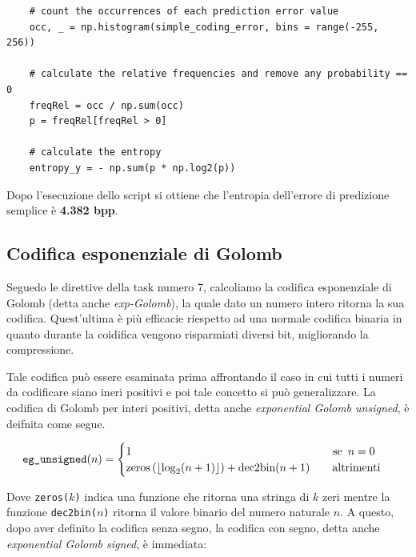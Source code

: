 \begin{lstlisting}
    # count the occurrences of each prediction error value
    occ, _ = np.histogram(simple_coding_error, bins = range(-255, 256))

    # calculate the relative frequencies and remove any probability == 0
    freqRel = occ / np.sum(occ)
    p = freqRel[freqRel > 0]

    # calculate the entropy
    entropy_y = - np.sum(p * np.log2(p))
\end{lstlisting}

\noindent Dopo l'esecuzione dello script si ottiene che l'entropia dell'errore di predizione semplice è \textbf{4.382 bpp}.



\subsection{Codifica esponenziale di Golomb}\label{exp-golomb}
Seguedo le direttive della task numero 7, calcoliamo la codifica esponenziale di Golomb (detta anche \textsl{exp-Golomb}), la quale dato un numero intero ritorna la sua codifica. Quest'ultima è più efficacie riespetto ad una normale codifica binaria in quanto durante la coidifica vengono risparmiati diversi bit, migliorando la compressione. 

Tale codifica può essere esaminata prima affrontando il caso in cui tutti i numeri da codificare siano ineri positivi e poi tale concetto si può generalizzare. La codifica di Golomb per interi positivi, detta anche \textsl{exponential Golomb unsigned}, è deifnita come segue.

\begin{gather*}
    \text{\texttt{eg\_unsigned}}(n) =
    \begin{cases}
        1 \hspace{180px} \text{se } \, n = 0 \\
        \text{zeros}\left( \left\lfloor \log_2(n + 1) \right\rfloor \right) + \text{dec2bin}(n + 1) \hspace{20px} \text{altrimenti}
    \end{cases}
\end{gather*}

\noindent Dove \texttt{zeros(}$k$\texttt{)} indica una funzione che ritorna una stringa di $k$ zeri mentre la funzione \texttt{dec2bin(}$n$\texttt{)} ritorna il valore binario del numero naturale $n$. A questo, dopo aver definito la codifica senza segno, la codifica con segno, detta anche \textsl{exponential Golomb signed}, è immediata:

